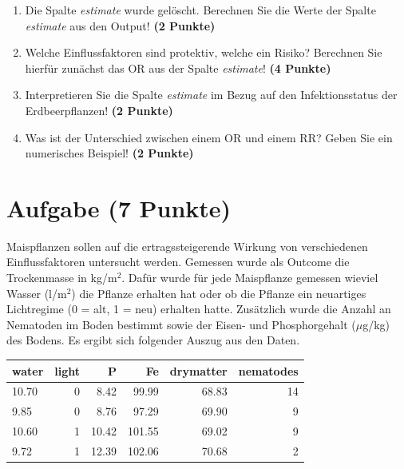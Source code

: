 \documentclass[a4paper, 10pt]{scrartcl}\usepackage[]{graphicx}\usepackage[]{color}
\newenvironment{knitrout}{}{} %
\begin{document}
\begin{enumerate}
\item Die Spalte \textit{estimate} wurde gel{\"o}scht. Berechnen Sie die Werte
  der Spalte \textit{estimate} aus den \Rlogo Output! \textbf{(2 Punkte)}
\item Welche Einflussfaktoren sind protektiv, welche ein Risiko? Berechnen
  Sie hierf{\"u}r zun{\"a}chst das OR aus der Spalte \textit{estimate}! \textbf{(4 Punkte)}
\item Interpretieren Sie die Spalte \textit{estimate} im Bezug auf den
  Infektionsstatus der Erdbeerpflanzen! \textbf{(2 Punkte)}
\item Was ist der Unterschied zwischen einem OR und einem RR? Geben Sie ein
  numerisches Beispiel! \textbf{(2 Punkte)}
\end{enumerate}
 
\clearpage

\section{Aufgabe \hfill (7 Punkte)}



Maispflanzen sollen auf die ertragssteigerende Wirkung von verschiedenen
Einflussfaktoren untersucht werden. Gemessen wurde als Outcome die
Trockenmasse in kg/m$^2$. Daf{\"u}r wurde f{\"u}r jede Maispflanze gemessen wieviel
Wasser (l/m$^2$) die Pflanze erhalten hat oder ob die Pflanze ein
neuartiges Lichtregime (0 = alt, 1 = neu) erhalten hatte. Zus{\"a}tzlich wurde
die Anzahl an Nematoden im Boden bestimmt sowie der Eisen- und
Phosphorgehalt ($\mu$g/kg) des Bodens. Es ergibt sich folgender Auszug aus
den Daten.

\begin{knitrout}
\color{fgcolor}\begin{table}[!h]
\centering
\begin{tabular}{lrrrrr}
\toprule
water & light & P & Fe & drymatter & nematodes\\
\midrule
10.70 & 0 & 8.42 & 99.99 & 68.83 & 14\\
9.85 & 0 & 8.76 & 97.29 & 69.90 & 9\\
10.60 & 1 & 10.42 & 101.55 & 69.02 & 9\\
9.72 & 1 & 12.39 & 102.06 & 70.68 & 2\\
\bottomrule
\end{tabular}
\end{table}

\end{knitrout}
\end{document}
